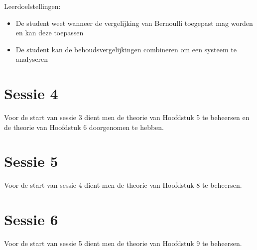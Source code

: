 Leerdoelstellingen:
\begin{itemize}
	\item De student weet wanneer de vergelijking van Bernoulli toegepast mag worden en kan deze toepassen
	\item De student kan de behoudsvergelijkingen combineren om een systeem te analyseren
\end{itemize}

	\section*{Sessie 4}
Voor de start van sessie 3 dient men de theorie van Hoofdstuk 5 te beheersen en de theorie van Hoofdstuk 6 doorgenomen te hebben.

	\section*{Sessie 5}
Voor de start van sessie 4 dient men de theorie van Hoofdstuk 8 te beheersen.
	
	\section*{Sessie 6}
Voor de start van sessie 5 dient men de theorie van Hoofdstuk 9 te beheersen.